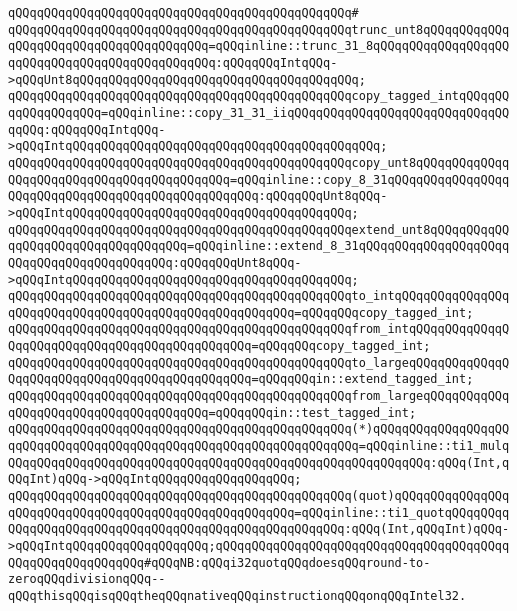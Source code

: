 \verb|qQQqqQQqqQQqqQQqqQQqqQQqqQQqqQQqqQQqqQQqqQQqqQQq#|\newline
\verb|qQQqqQQqqQQqqQQqqQQqqQQqqQQqqQQqqQQqqQQqqQQqqQQqtrunc_unt8qQQqqQQqqQQqqQQqqQQqqQQqqQQqqQQqqQQqqQQq=qQQqinline::trunc_31_8qQQqqQQqqQQqqQQqqQQqqQQqqQQqqQQqqQQqqQQqqQQqqQQq:qQQqqQQqIntqQQq->qQQqUnt8qQQqqQQqqQQqqQQqqQQqqQQqqQQqqQQqqQQqqQQq;|\newline
\verb|qQQqqQQqqQQqqQQqqQQqqQQqqQQqqQQqqQQqqQQqqQQqqQQqcopy_tagged_intqQQqqQQqqQQqqQQqqQQq=qQQqinline::copy_31_31_iiqQQqqQQqqQQqqQQqqQQqqQQqqQQqqQQqqQQq:qQQqqQQqIntqQQq->qQQqIntqQQqqQQqqQQqqQQqqQQqqQQqqQQqqQQqqQQqqQQqqQQq;|\newline
\verb|qQQqqQQqqQQqqQQqqQQqqQQqqQQqqQQqqQQqqQQqqQQqqQQqcopy_unt8qQQqqQQqqQQqqQQqqQQqqQQqqQQqqQQqqQQqqQQqqQQq=qQQqinline::copy_8_31qQQqqQQqqQQqqQQqqQQqqQQqqQQqqQQqqQQqqQQqqQQqqQQqqQQq:qQQqqQQqUnt8qQQq->qQQqIntqQQqqQQqqQQqqQQqqQQqqQQqqQQqqQQqqQQqqQQq;|\newline
\verb|qQQqqQQqqQQqqQQqqQQqqQQqqQQqqQQqqQQqqQQqqQQqqQQqextend_unt8qQQqqQQqqQQqqQQqqQQqqQQqqQQqqQQqqQQq=qQQqinline::extend_8_31qQQqqQQqqQQqqQQqqQQqqQQqqQQqqQQqqQQqqQQqqQQq:qQQqqQQqUnt8qQQq->qQQqIntqQQqqQQqqQQqqQQqqQQqqQQqqQQqqQQqqQQqqQQq;|\newline
\newline
\verb|qQQqqQQqqQQqqQQqqQQqqQQqqQQqqQQqqQQqqQQqqQQqqQQqto_intqQQqqQQqqQQqqQQqqQQqqQQqqQQqqQQqqQQqqQQqqQQqqQQqqQQqqQQq=qQQqqQQqcopy_tagged_int;|\newline
\verb|qQQqqQQqqQQqqQQqqQQqqQQqqQQqqQQqqQQqqQQqqQQqqQQqfrom_intqQQqqQQqqQQqqQQqqQQqqQQqqQQqqQQqqQQqqQQqqQQqqQQq=qQQqqQQqcopy_tagged_int;|\newline
\verb|qQQqqQQqqQQqqQQqqQQqqQQqqQQqqQQqqQQqqQQqqQQqqQQqto_largeqQQqqQQqqQQqqQQqqQQqqQQqqQQqqQQqqQQqqQQqqQQqqQQq=qQQqqQQqin::extend_tagged_int;|\newline
\verb|qQQqqQQqqQQqqQQqqQQqqQQqqQQqqQQqqQQqqQQqqQQqqQQqfrom_largeqQQqqQQqqQQqqQQqqQQqqQQqqQQqqQQqqQQqqQQq=qQQqqQQqin::test_tagged_int;|\newline
\newline
\verb|qQQqqQQqqQQqqQQqqQQqqQQqqQQqqQQqqQQqqQQqqQQqqQQq(*)qQQqqQQqqQQqqQQqqQQqqQQqqQQqqQQqqQQqqQQqqQQqqQQqqQQqqQQqqQQqqQQqqQQq=qQQqinline::ti1_mulqQQqqQQqqQQqqQQqqQQqqQQqqQQqqQQqqQQqqQQqqQQqqQQqqQQqqQQqqQQq:qQQq(Int,qQQqInt)qQQq->qQQqIntqQQqqQQqqQQqqQQqqQQq;|\newline
\verb|qQQqqQQqqQQqqQQqqQQqqQQqqQQqqQQqqQQqqQQqqQQqqQQq(quot)qQQqqQQqqQQqqQQqqQQqqQQqqQQqqQQqqQQqqQQqqQQqqQQqqQQqqQQq=qQQqinline::ti1_quotqQQqqQQqqQQqqQQqqQQqqQQqqQQqqQQqqQQqqQQqqQQqqQQqqQQqqQQq:qQQq(Int,qQQqInt)qQQq->qQQqIntqQQqqQQqqQQqqQQqqQQq;qQQqqQQqqQQqqQQqqQQqqQQqqQQqqQQqqQQqqQQqqQQqqQQqqQQqqQQqqQQq#qQQqNB:qQQqi32quotqQQqdoesqQQqround-to-zeroqQQqdivisionqQQq--qQQqthisqQQqisqQQqtheqQQqnativeqQQqinstructionqQQqonqQQqIntel32.|\newline

